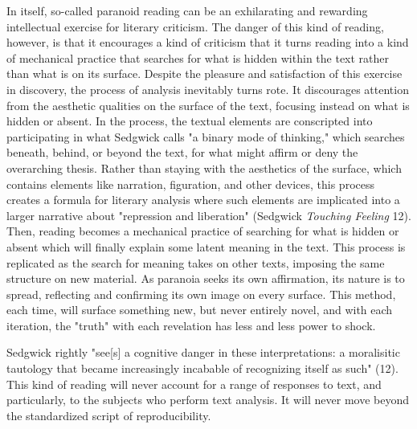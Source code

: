 \documentclass[11pt]{article}
\begin{document}
In itself, so-called paranoid reading can be an exhilarating and
rewarding intellectual exercise for literary criticism. The danger of
this kind of reading, however, is that it encourages a kind of
criticism that it turns reading into a kind of mechanical practice
that searches for what is hidden within the text rather than what is
on its surface. Despite the pleasure and satisfaction of this exercise
in discovery, the process of analysis inevitably turns rote. It
discourages attention from the aesthetic qualities on the surface of
the text, focusing instead on what is hidden or absent. In the
process, the textual elements are conscripted into participating in
what Sedgwick calls "a binary mode of thinking," which searches
beneath, behind, or beyond the text, for what might affirm or deny the
overarching thesis. Rather than staying with the aesthetics of the
surface, which contains elements like narration, figuration, and other
devices, this process creates a formula for literary analysis where
such elements are implicated into a larger narrative about "repression
and liberation" (Sedgwick \emph{Touching Feeling} 12). Then, reading
becomes a mechanical practice of searching for what is hidden or
absent which will finally explain some latent meaning in the
text. This process is replicated as the search for meaning takes on
other texts, imposing the same structure on new material. As paranoia
seeks its own affirmation, its nature is to spread, reflecting and
confirming its own image on every surface. This method, each time,
will surface something new, but never entirely novel, and with each
iteration, the "truth" with each revelation has less and less power to
shock.

Sedgwick rightly "see[s] a cognitive danger in these interpretations:
a moralisitic tautology that became increasingly incabable of
recognizing itself as such" (12). This kind of reading will never
account for a range of responses to text, and particularly, to the
subjects who perform text analysis. It will never move beyond the
standardized script of reproducibility.
\end{document}
